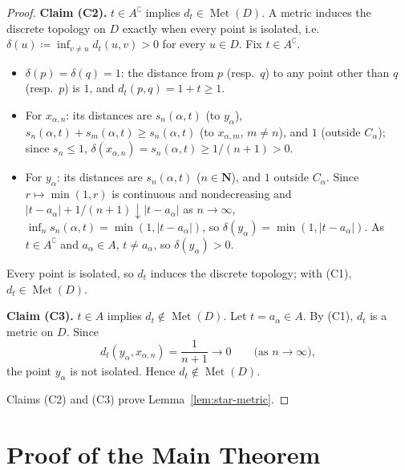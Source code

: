 \documentclass[12pt]{article}
\theoremstyle{definition}
\newtheorem{remark}[theorem]{Remark}
\newcommand{\Met}{\operatorname{Met}}
\begin{document}
\begin{proof}
  \medskip\noindent\textbf{Claim (C2).} $t \in A^\complement$ implies $d_t \in \Met(D)$.
  A metric induces the discrete topology on $D$ exactly when every point is
  isolated, i.e. $\delta(u) \coloneqq \inf_{v\ne u} d_t(u,v) > 0$ for every $u \in
  D$. Fix $t \in A^\complement$.
  \begin{itemize}
  \item $\delta(p)=\delta(q)=1$: the distance from $p$ (resp.\ $q$) to any
    point other than $q$ (resp.\ $p$) is $1$, and $d_t(p,q)=1+t\ge 1$.
  \item For $x_{\alpha,n}$: its distances are $s_n(\alpha,t)$
    (to $y_\alpha$), $s_n(\alpha,t)+s_m(\alpha,t) \ge s_n(\alpha,t)$ (to
    $x_{\alpha,m}$, $m \ne n$), and $1$ (outside $C_\alpha$); since $s_n
    \le 1$, $\delta(x_{\alpha,n}) = s_n(\alpha,t) \ge 1/(n+1)>0$.
  \item For $y_\alpha$: its distances are $s_n(\alpha,t)$
    ($n\in\mathbf{N}$), and $1$ outside $C_\alpha$.
    Since $r\mapsto\min(1,r)$ is continuous and nondecreasing and
    $\lvert t-a_\alpha\rvert+1/(n+1) \downarrow \lvert t-a_\alpha\rvert$ as
    $n\to\infty$, $\inf_n s_n(\alpha,t) = \min(1,\lvert t-a_\alpha\rvert)$,
    so $\delta(y_\alpha)=\min(1,\lvert t-a_\alpha\rvert)$. As $t \in
    A^\complement$ and $a_\alpha \in A$, $t \ne a_\alpha$, so
    $\delta(y_\alpha)>0$.
  \end{itemize}
  Every point is isolated, so $d_t$ induces the discrete topology; with
  (C1), $d_t \in \Met(D)$.

  \medskip\noindent\textbf{Claim (C3).} $t \in A$ implies $d_t \notin \Met(D)$.
  Let $t=a_\alpha\in A$. By (C1), $d_t$ is a metric on $D$. Since
  \[
    d_t(y_\alpha,x_{\alpha,n})=\frac{1}{n+1}\to 0
    \qquad \text{(as $n\to\infty$)},
  \]
  the point $y_\alpha$ is not isolated. Hence $d_t\notin\Met(D)$.

  Claims (C2) and (C3) prove Lemma~\ref{lem:star-metric}.
\end{proof}


\section{Proof of the Main Theorem}
\label{sec:closed-image}
\end{document}
